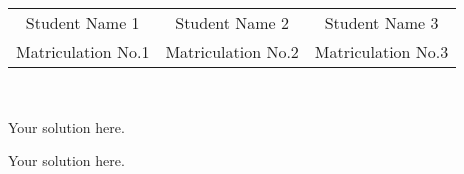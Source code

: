 \documentclass[
	authors = {{J.~Zhang, L.~Einig}},
	title = {{Introduction to Robotics}},
	department = {{Department of Informatics}},
	group = {{Technical Aspects of Multimodal Systems}},
	type = {{Assignment}},
	id = {{0}},
]{tamsAssignment}
\begin{document}
\header{}
{\centering
	\begin{tabular}{ccc}
		Student Name 1 & Student Name 2 & Student Name 3 \\
		Matriculation No.1 & Matriculation No.2 & Matriculation No.3
	\end{tabular}\\
}


Your solution here.


Your solution here.

\end{document}
